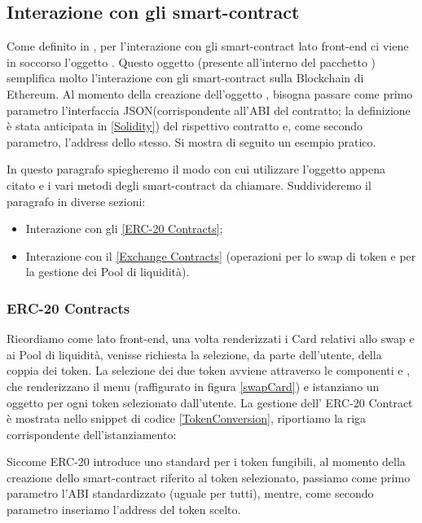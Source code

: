 \subsection{Interazione con gli smart-contract}\label{interazione_smartc}
Come definito in \cite{web3API}, per l'interazione con gli smart-contract lato front-end ci viene in soccorso l'oggetto . Questo oggetto (presente all'interno del pacchetto ) semplifica molto l'interazione con gli smart-contract sulla Blockchain di Ethereum. Al momento della creazione dell'oggetto , bisogna passare come primo parametro l'interfaccia JSON(corrispondente all'ABI del contratto; la definizione è stata anticipata in \ref{Solidity}) del rispettivo contratto e, come secondo parametro, l'address dello stesso. Si mostra di seguito un esempio pratico.
\begin{quote}
\centering
{}
\end{quote}

In questo paragrafo spiegheremo il modo con cui utilizzare l'oggetto appena citato e i vari metodi degli smart-contract da chiamare. Suddivideremo il paragrafo in diverse sezioni:
\begin{itemize}
\item Interazione con gli \ref{ERC-20 Contracts};
\item Interazione con il \ref{Exchange Contracts} (operazioni per lo swap di token e per la gestione dei Pool di liquidità).
\end{itemize}

\subsubsection{ERC-20 Contracts}\makeatletter{}\makeatother
\label{ERC-20 Contracts}
Ricordiamo come lato front-end, una volta renderizzati i Card relativi allo swap e ai Pool di liquidità, venisse richiesta la selezione, da parte dell'utente, della coppia dei token. La selezione dei due token avviene attraverso le componenti  e , che renderizzano il menu (raffigurato in figura \ref{swapCard}) e istanziano un oggetto  per ogni token selezionato dall'utente.
La gestione dell' ERC-20 Contract è mostrata nello snippet di codice \ref{TokenConversion}, riportiamo la riga corrispondente dell'istanziamento:
\begin{quote}
\centering
{}
\end{quote}
Siccome ERC-20 introduce uno standard per i token fungibili, al momento della creazione dello smart-contract riferito al token selezionato, passiamo come primo parametro l'ABI standardizzato (uguale per tutti), mentre, come secondo parametro inseriamo l'address del token scelto.

